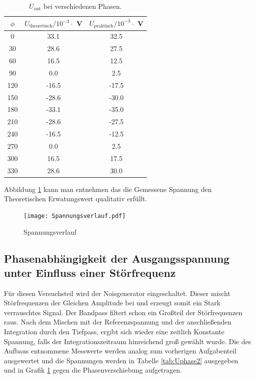 \begin{table}
  \centering
  \begin{tabular}{c c c}
    \toprule
    $\phi$ & $U_{\text{theoretisch}} / 10^{-3} \cdot $ V & $U_{\text{praktisch}} / 10^{-3} \cdot $ V \\
    \midrule
    0	&  33.1  &  32.5	\\
    30	&  28.6  &  27.5	\\
    60	&  16.5  &  12.5	\\
    90	&  0.0 	 &   2.5	\\
    120	& -16.5  & -17.5	\\
    150	& -28.6  & -30.0	\\
    180	& -33.1  & -35.0	\\
    210	& -28.6  & -27.5	\\
    240	& -16.5  & -12.5	\\
    270	&  0.0 	 &  2.5	 	\\
    300	&  16.5  &  17.5	\\
    330	&  28.6	 &  30.0	\\
  \end{tabular}
  \caption{$U_{\text{out}}$ bei verschiedenen Phasen.}
  \label{tab:Uphase}
\end{table}
Abbildung \ref{fig:Spannungsverlauf} kann man entnehmen das die Gemessene Spannung den Theoretischen Erwatungswert qualitativ erfüllt.
\begin{figure}
  \centering
  \texttt{[image: Spannungsverlauf.pdf]}
  \caption{Spannungsverlauf}
  \label{fig:Spannungsverlauf}
\end{figure}
\subsection{Phasenabhängigkeit der Ausgangsspannung unter Einfluss einer Störfrequenz}
Für diesen Versuchsteil wird der Noisgenerator eingeschaltet. Dieser mischt Störfrequenzen der Gleichen Amplitude bei und erzeugt somit ein Stark verrauschtes Signal. Der Bandpass filtert schon ein Großteil der Störfrequenzen raus. Nach dem Mischen mit der Referenzspannung und der anschließenden Integration durch den Tiefpass, ergibt sich wieder eine zeitlich Konstante Spannung, falls der Integrationszeitraum hinreichend groß gewählt wurde. Die des Aufbaus entnommene Messwerte werden analog zum vorherigen Aufgabenteil ausgewertet und die Spannungen werden in Tabelle \ref{tab:Uphase2} ausgegeben und in Grafik \ref{fig:Spannungsverlauf} gegen die Phasenverschiebung aufgetragen.

